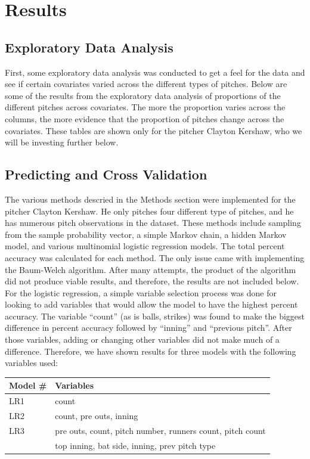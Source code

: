 \documentclass{article}
\begin{document}
\section{Results}

\subsection{Exploratory Data Analysis}

First, some exploratory data analysis was conducted to get a feel for the data and see if certain covariates varied across the different types of pitches. Below are some of the results from the exploratory data analysis of proportions of the different pitches across covariates. The more the proportion varies across the columns, the more evidence that the proportion of pitches change across the covariates. These tables are shown only for the pitcher Clayton Kershaw, who we will be investing further below.






\subsection{Predicting and Cross Validation}

The various methods descried in the Methods section were implemented for the pitcher Clayton Kershaw. He only pitches four different type of pitches, and he has numerous pitch observations in the dataset. These methods include sampling from the sample probability vector, a simple Markov chain, a hidden Markov model, and various multinomial logistic regression models. The total percent accuracy was calculated for each method. The only issue came with implementing the Baum-Welch algorithm. After many attempts, the product of the algorithm did not produce viable results, and therefore, the results are not included below. For the logistic regression, a simple variable selection process was done for looking to add variables that would allow the model to have the highest percent accuracy. The variable ``count'' (as is balls, strikes) was found to make the biggest difference in percent accuracy followed by ``inning'' and ``previous pitch''. After those variables, adding or changing other variables did not make much of a difference. Therefore, we have shown results for three models with the following variables used:\\ 
\begin{center}
\begin{tabular}{|l|l|}
	\hline
	Model \# & Variables \\ 
	\hline
	LR1  & count \\ 
	\hline
	LR2  & count, pre outs, inning \\
	\hline
	LR3  & pre outs, count, pitch number, runners count, pitch count \\ 
	& top inning, bat side, inning, prev pitch type \\
	\hline
\end{tabular}
\end{center}
\end{document}
